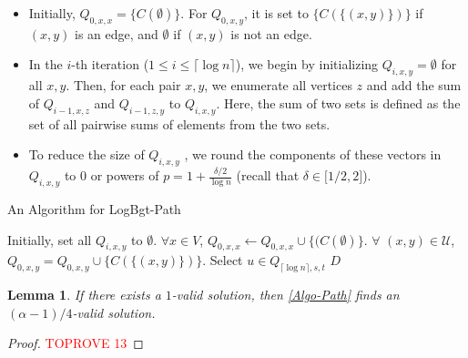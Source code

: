 \documentclass[11pt,a4paper]{article} \usepackage{enumitem}
\newcommand{\calU}{\mathcal{U}}
\newcommand{\LBOpath}{\textsf{LogBgt-Path}}
\newtheorem{lemma}[theorem]{Lemma}
\theoremstyle{definition}
\begin{document}
\begin{itemize}
\item Initially, $Q_{0, x, x} = \{ C(\emptyset) \}$. For $Q_{0, x, y}$, it is set to $\{ C(\{(x, y)\}) \}$ if $(x, y)$ is an edge, and $\emptyset$ if $(x, y)$ is not an edge.

\item In the $i$-th iteration ($1 \leq i \leq \lceil \log n \rceil$), we begin by initializing $Q_{i, x, y} = \emptyset$ for all $x, y$. Then, for each pair $x, y$, we enumerate all vertices $z$ and add the sum of $Q_{i-1, x, z}$ and $Q_{i-1, z, y}$ to $Q_{i, x, y}$. Here, the sum of two sets is defined as the set of all pairwise sums of elements from the two sets.
 
\item To reduce the size of $Q_{i, x, y}$ , we round the components of these vectors in $Q_{i,x,y}$ to $0$ or powers of $p = 1 + \frac{\delta/2}{\log n}$ (recall that $\delta\in \lbrack 1/2,2\rbrack$).

\end{itemize}
\begin{algorithm}[H]
\caption{An Algorithm for \LBOpath}
\label{Algo-Path}
Initially, set all $Q_{i,x,y}$ to $\emptyset$.\;
$\forall x\in V$, $Q_{0,x,x}\gets Q_{0,x,x}\cup \lbrace (C(\emptyset) \rbrace$. \;
$\forall$ $(x,y)\in \calU$, $Q_{0,x,y}=Q_{0,x,y}\cup \lbrace C(\lbrace (x,y)\rbrace)\rbrace$.\; 
Select $u\in Q_{\lceil \log n\rceil,s,t}$\;
\Return $D$
\end{algorithm}

\begin{lemma}\label{lem:algo-path-1}
If there exists a $1$-valid solution, then \cref{Algo-Path} finds an $(\alpha-1)/4$-valid solution. 
\end{lemma}
\begin{proof}\textcolor{red}{TOPROVE 13}\end{proof}
\end{document}
